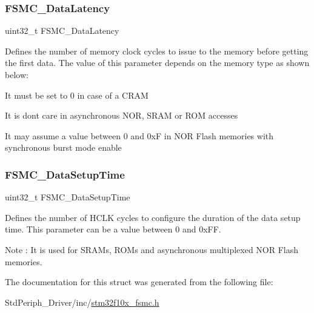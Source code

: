 \subsubsection{\texorpdfstring{FSMC\_DataLatency}{FSMC\_DataLatency}}
{\footnotesize\ttfamily uint32\+\_\+t F\+S\+M\+C\+\_\+\+Data\+Latency}

Defines the number of memory clock cycles to issue to the memory before getting the first data. The value of this parameter depends on the memory type as shown below\+:
\begin{DoxyItemize}
\item It must be set to 0 in case of a C\+R\+AM
\item It is don\textquotesingle{}t care in asynchronous N\+OR, S\+R\+AM or R\+OM accesses
\item It may assume a value between 0 and 0xF in N\+OR Flash memories with synchronous burst mode enable 
\end{DoxyItemize}\mbox{\label{struct_f_s_m_c___n_o_r_s_r_a_m_timing_init_type_def_a8c62c50435a67ef4de2f27b539c4c851}} 
\subsubsection{\texorpdfstring{FSMC\_DataSetupTime}{FSMC\_DataSetupTime}}
{\footnotesize\ttfamily uint32\+\_\+t F\+S\+M\+C\+\_\+\+Data\+Setup\+Time}

Defines the number of H\+C\+LK cycles to configure the duration of the data setup time. This parameter can be a value between 0 and 0x\+FF. \begin{DoxyNote}{Note}
\+: It is used for S\+R\+A\+Ms, R\+O\+Ms and asynchronous multiplexed N\+OR Flash memories. 
\end{DoxyNote}


The documentation for this struct was generated from the following file\+:\begin{DoxyCompactItemize}
\item 
Std\+Periph\+\_\+\+Driver/inc/\mbox{\hyperlink{stm32f10x__fsmc_8h}{stm32f10x\+\_\+fsmc.\+h}}\end{DoxyCompactItemize}
